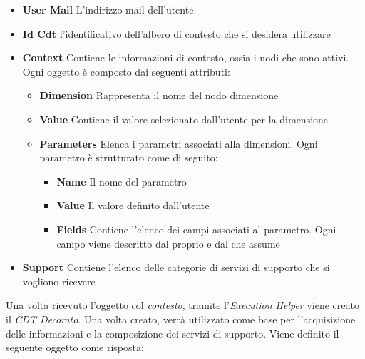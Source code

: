 \begin{itemize}
	\item \textbf{User Mail}
	L'indirizzo mail dell'utente
	\item \textbf{Id Cdt}
	\upe l'identificativo dell'albero di contesto che si desidera utilizzare
	\item \textbf{Context}
	Contiene le informazioni di contesto, ossia i nodi che sono attivi. Ogni oggetto è composto dai seguenti attributi:
	\begin{itemize}
		\item \textbf{Dimension}
		Rappresenta il nome del nodo dimensione
		\item \textbf{Value}
		Contiene il valore selezionato dall'utente per la dimensione
		\item \textbf{Parameters}
		Elenca i parametri associati alla dimensioni. Ogni parametro è strutturato come di seguito:
		\begin{itemize}
			\item \textbf{Name}
			Il nome del parametro
			\item \textbf{Value}
			Il valore definito dall'utente
			\item \textbf{Fields}
			Contiene l'elenco dei campi associati al parametro. Ogni campo viene descritto dal proprio  e dal  che assume
		\end{itemize}
	\end{itemize}
	\item \textbf{Support}
	Contiene l'elenco delle categorie di servizi di supporto che si vogliono ricevere
\end{itemize}

Una volta ricevuto l'oggetto col \emph{contesto}, tramite l'\emph{Execution Helper} viene creato il \emph{CDT Decorato}. Una volta creato, verrà utilizzato come base per l'acquisizione delle informazioni e la composizione dei servizi di supporto. Viene definito il seguente oggetto come risposta:

